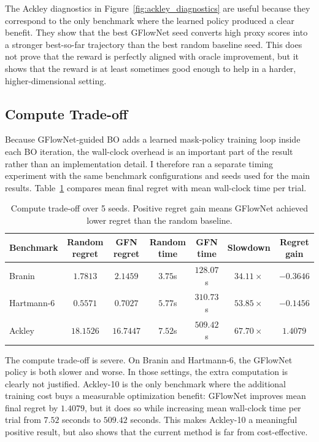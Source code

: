 \documentclass{article}
\begin{document}
The Ackley diagnostics in Figure~\ref{fig:ackley_diagnostics} are useful because they correspond to the only benchmark where the learned policy produced a clear benefit. They show that the best GFlowNet seed converts high proxy scores into a stronger best-so-far trajectory than the best random baseline seed. This does not prove that the reward is perfectly aligned with oracle improvement, but it shows that the reward is at least sometimes good enough to help in a harder, higher-dimensional setting.

\subsection{Compute Trade-off}

Because GFlowNet-guided BO adds a learned mask-policy training loop inside each BO iteration, the wall-clock overhead is an important part of the result rather than an implementation detail. I therefore ran a separate timing experiment with the same benchmark configurations and seeds used for the main results. Table~\ref{tab:compute_tradeoff} compares mean final regret with mean wall-clock time per trial.

\begin{table}[t]
\centering
\caption{Compute trade-off over 5 seeds. Positive regret gain means GFlowNet achieved lower regret than the random baseline.}
\label{tab:compute_tradeoff}
\small
\begin{tabular}{lcccccc}
\toprule
Benchmark & Random regret & GFN regret & Random time & GFN time & Slowdown & Regret gain \\
\midrule
Branin & $1.7813$ & $2.1459$ & $3.75$s & $128.07$s & $34.11\times$ & $-0.3646$ \\
Hartmann-6 & $0.5571$ & $0.7027$ & $5.77$s & $310.73$s & $53.85\times$ & $-0.1456$ \\
Ackley & $18.1526$ & $16.7447$ & $7.52$s & $509.42$s & $67.70\times$ & $1.4079$ \\
\bottomrule
\end{tabular}
\end{table}

The compute trade-off is severe. On Branin and Hartmann-6, the GFlowNet policy is both slower and worse. In those settings, the extra computation is clearly not justified. Ackley-10 is the only benchmark where the additional training cost buys a measurable optimization benefit: GFlowNet improves mean final regret by $1.4079$, but it does so while increasing mean wall-clock time per trial from $7.52$ seconds to $509.42$ seconds. This makes Ackley-10 a meaningful positive result, but also shows that the current method is far from cost-effective.
\end{document}
